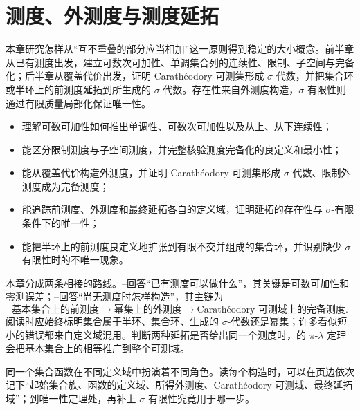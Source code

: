 \chapter{测度、外测度与测度延拓}
\label{b1:ch:02}
\begin{chapterabstract}
本章研究怎样从“互不重叠的部分应当相加”这一原则得到稳定的大小概念。前半章从已有测度出发，建立可数次可加性、单调集合列的连续性、限制、子空间与完备化；后半章从覆盖代价出发，证明 Carathéodory 可测集形成 \(\sigma\)-代数，并把集合环或半环上的前测度延拓到所生成的 \(\sigma\)-代数。存在性来自外测度构造，\(\sigma\)-有限性则通过有限质量局部化保证唯一性。
\end{chapterabstract}

\begin{learninggoals}
\begin{itemize}
  \item\label{b1:item:ch02-goal-01} 理解可数可加性如何推出单调性、可数次可加性以及从上、从下连续性；
  \item\label{b1:item:ch02-goal-02} 能区分限制测度与子空间测度，并完整核验测度完备化的良定义和最小性；
  \item\label{b1:item:ch02-goal-03} 能从覆盖代价构造外测度，并证明 Carathéodory 可测集形成 \(\sigma\)-代数、限制外测度成为完备测度；
  \item\label{b1:item:ch02-goal-04} 能追踪前测度、外测度和最终延拓各自的定义域，证明延拓的存在性与 \(\sigma\)-有限条件下的唯一性；
  \item\label{b1:item:ch02-goal-05} 能把半环上的前测度良定义地扩张到有限不交并组成的集合环，并识别缺少 \(\sigma\)-有限性时的不唯一现象。
\end{itemize}
\end{learninggoals}

本章分成两条相接的路线。--回答“已有测度可以做什么”，其关键是可数可加性和零测误差；--回答“尚无测度时怎样构造”，其主链为
\[
\text{基本集合上的前测度}
\longrightarrow
\text{幂集上的外测度}
\longrightarrow
\text{Carathéodory 可测域上的完备测度}.
\]
阅读时应始终标明集合属于半环、集合环、生成的 \(\sigma\)-代数还是幂集；许多看似短小的错误都来自定义域混用。判断两种延拓是否给出同一个测度时，的 \(\pi\)-\(\lambda\) 定理会把基本集合上的相等推广到整个可测域。

\ProseParagraphBreak

同一个集合函数在不同定义域中扮演着不同角色。读每个构造时，可以在页边依次记下“起始集合族、函数的定义域、所得外测度、Carathéodory 可测域、最终延拓域”；到唯一性定理处，再补上 \(\sigma\)-有限性究竟用于哪一步。

